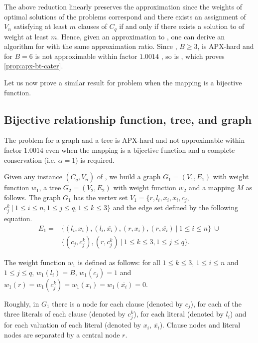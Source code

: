 		The above reduction linearly preserves the approximation since the weights of optimal solutions of the problems correspond and there exists an assignment of $V_n$ satisfying at least $m$ clauses of $C_q$ if and only if there exists a solution to \mwccs{} of weight at least $m$. Hence, given an approximation to \mwccs{}, one can derive an algorithm for \msat{} with the same approximation ratio. Since \msat{}, $B\geq 3$, is APX-hard \cite{papadimitriou1991optimization} and \msat{} for $B=6$ is not approximable within factor $1.0014$ \cite{berman1999some}, so is \mwccs{}, which proves \cref{prop:apx-bt-cater}.

		Let us now prove a similar result for \mwccs{} problem when the mapping is a bijective function.


		\subsection{Bijective relationship function, tree, and graph}
		\label{subsec:apx-t-graph}

		\begin{proposition}\label{prop:apx-t-graph}
  	  	  The \mwccs{} problem for a graph and a tree is APX-hard and not approximable within factor $1.0014$ even when the mapping is a bijective function and a complete conservation (i.e. $\alpha = 1$) is required.
		\end{proposition}

		Given any instance $(C_q,V_n)$ of \msat{}, we build a graph $G_1=(V_1,E_1)$ with weight function $w_1$, a tree $G_2=(V_2,E_2)$ with weight function $w_2$ and a mapping $M$ as follows. The graph $G_1$ has the vertex set $V_1=\{r, l_i, x_i, \overline{x_i}, c_j,$ $ c^k_j ~\vert~ 1\leq i\leq n, 1\leq j \leq q, 1\leq k \leq 3\}$ and the edge set defined by the following equation.
		\begin{align*}
		E_1= & \{(l_i,x_i), (l_i,\overline{x_i}), (r,x_i), (r,\overline{x_i}) ~\vert~ 1\leq i\leq n\} ~\cup  \\
 	 	 & \{(c_j,c_j^k), (r,c_j^k)  ~\vert~ 1\leq k \leq 3, 1\leq j \leq q\}.
		\end{align*}

		The weight function $w_1$ is defined as follows: for all $1\leq k \leq 3$, $1\leq i\leq n$ and $1\leq j \leq q$, $w_1(l_i)=B$, $w_1(c_j)=1$ and $w_1(r)=w_1(c_j^k)=w_1(x_i)=w_1(\overline{x_i})=0$.

		Roughly, in $G_1$ there is a node for each clause (denoted by $c_j$), for each of the three literals of each clause (denoted by $c_j^k$), for each literal (denoted by $l_i$) and for each valuation of each literal (denoted by $x_i$, $\overline{x_i}$). Clause nodes and literal nodes are separated by a central node $r$.

